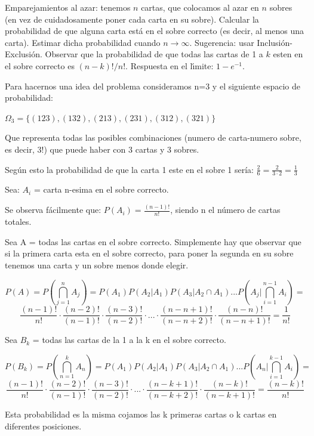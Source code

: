 \begin{problem}[11] Emparejamientos al azar: tenemos $n$ cartas, que colocamos al azar en $n$ sobres
(en vez de cuidadosamente poner cada carta en su sobre).
Calcular la probabilidad de que alguna carta est\'a en el sobre correcto
(es decir, al menos una carta). Estimar dicha probabilidad cuando
$n\to\infty$. Sugerencia: usar Inclusi\'on-Exclusi\'on.
Observar que la probabilidad de que todas las cartas de 1 a $k$ esten en el sobre correcto
es $(n-k)!/n!$. Respuesta en el l\'{\i}mite: $1 - e^{-1}$.
\solution

\begin{expla}

Para hacernos una idea del problema consideramos n=3 y el siguiente espacio de probabilidad:

$\Omega_3=\{(123),(132),(213),(231),(312),(321)\}$

Que representa todas las posibles combinaciones (numero de carta-numero sobre, es decir, 3!) que puede haber con 3 cartas y 3 sobres. 

Según esto la probabilidad de que la carta 1 este en el sobre 1 sería: $\frac{2}{6} = \frac{2}{3\cdot 2}=\frac{1}{3}$

Sea: $A_i$ = carta n-esima en el sobre correcto.

Se observa fácilmente que: $P(A_i) = \frac{(n-1)!}{n!}$, siendo n el número de cartas totales.

Sea A = todas las cartas en el sobre correcto. Simplemente hay que observar que si la primera carta esta en el sobre correcto, para poner la segunda en su sobre tenemos una carta y un sobre menos donde elegir.

\[
P(A)=P(\bigcap_{j=1}^nA_j)=P(A_1)P(A_2|A_1)P(A_3|A_2\cap A_1)...P(A_j|\bigcap_{i=1}^{n-1}A_i)=
\]
\[
\frac{(n-1)!}{n!}\cdot\frac{(n-2)!}{(n-1)!}\cdot\frac{(n-3)!}{(n-2)!}\cdot...\cdot\frac{(n-n+1)!}{(n-n+2)!}\cdot\frac{(n-n)!}{(n-n+1)!}=\frac{1}{n!}
\]

Sea $B_k$ = todas las cartas de la 1 a la k en el sobre correcto.

\[
P(B_k)=P(\bigcap_{n=1}^kA_n)=P(A_1)P(A_2|A_1)P(A_3|A_2\cap A_1)...P(A_n|\bigcap_{i=1}^{k-1}A_i)=
\]
\[
\frac{(n-1)!}{n!}\cdot\frac{(n-2)!}{(n-1)!}\cdot\frac{(n-3)!}{(n-2)!}\cdot...\cdot\frac{(n-k+1)!}{(n-k+2)!}\cdot\frac{(n-k)!}{(n-k+1)!}=\frac{(n-k)!}{n!}
\]

Esta probabilidad es la misma cojamos las k primeras cartas o k cartas en diferentes posiciones.
\end{expla}


\end{problem}
